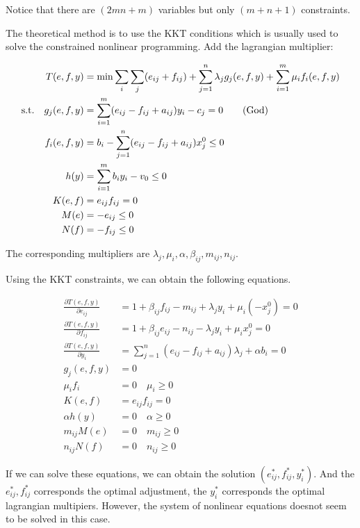 \documentclass[UTF8]{article}
\begin{document}
Notice that there are $(2mn+m)$ variables but only $(m+n+1)$ constraints.

The theoretical method is to use the KKT conditions which is usually used to solve the constrained nonlinear programming.
Add the lagrangian multiplier:

\begin{align}
  T(e,f,y) &= \min \sum_i\sum_j(e_{ij}+f_{ij}) + \sum_{j=1}^n \lambda_j
  g_j(e,f,y) + \sum_{i=1}^m \mu_i f_i(e,f,y)\nonumber\\
\mathrm{s.t.}  \quad   g_j(e,f,y) &= \sum_{i=1}^m (e_{ij}-f_{ij}+a_{ij})y_i-c_j = 0 \tag{\text{God}} \\
  f_i(e,f,y) &= b_i - \sum_{j=1}^n (e_{ij}-f_{ij}+a_{ij})x_j^0 \leq 0 \\
  h(y) &= \sum_{i=1}^m b_i y_i - v_0 \leq 0\\
  K(e,f) &= e_{ij}f_{ij}=0  \\
  M(e) &= -e_{ij} \leq 0 \label{M}  \\
  N(f) &= -f_{ij} \leq 0
\end{align}

The corresponding multipliers are $\lambda_j, \mu_i, \alpha, \beta_{ij}, m_{ij}, n_{ij}$.

Using the KKT constraints, we can obtain the following equations.

\begin{align*}
  \frac{\partial T(e,f,y)}{\partial e_{ij}} &= 1+ \beta_{ij} f_{ij} - m_{ij}+\lambda_j y_i + \mu_i(-x_j^0) = 0  \\
  \frac{\partial T(e,f,y)}{\partial f_{ij}} &= 1+ \beta_{ij} e_{ij} - n_{ij}-\lambda_j y_i + \mu_i x_j^0 = 0   \\
  \frac{\partial T(e,f,y)}{\partial y_{i}} &=\sum_{j=1}^n(e_{ij}-f_{ij}+a_{ij})\lambda_j + \alpha b_i = 0 \\
  g_j(e,f,y) &=0 \\
  \mu_i f_i &= 0 \quad \mu_i \geq 0 \\
  K(e,f) &= e_{ij}f_{ij} =0 \\
  \alpha h(y) &=0 \quad \alpha \geq 0\\
  m_{ij} M(e) &=0 \quad m_{ij} \geq 0 \\
  n_{ij} N(f) &=0 \quad n_{ij} \geq 0
\end{align*}

If we can solve these equations, we can obtain the solution $(e_{ij}^*, f_{ij}^*, y_i^*)$. And the $e_{ij}^*, f_{ij}^*$ corresponds the optimal adjustment, the $y_i^*$ corresponds the optimal lagrangian multipiers.
However, the system of nonlinear equations doesnot seem to be solved in this case.
\end{document}
